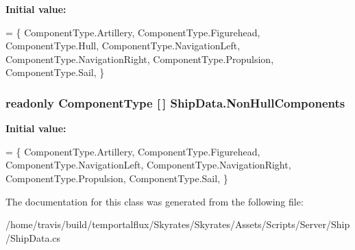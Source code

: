 {\bfseries Initial value\-:}
\begin{DoxyCode}
=
    \{
        ComponentType.Artillery,
        ComponentType.Figurehead,
        ComponentType.Hull,
        ComponentType.NavigationLeft,
        ComponentType.NavigationRight,
        ComponentType.Propulsion,
        ComponentType.Sail,
    \}
\end{DoxyCode}
\hypertarget{class_ship_data_a5ef95366640e8dc06cb884368a8e41a2}{
\subsubsection[{Non\-Hull\-Components}]{\setlength{\rightskip}{0pt plus 5cm}readonly Component\-Type \mbox{[}$\,$\mbox{]} Ship\-Data.\-Non\-Hull\-Components\hspace{0.3cm}{\ttfamily [static]}}}\label{class_ship_data_a5ef95366640e8dc06cb884368a8e41a2}
{\bfseries Initial value\-:}
\begin{DoxyCode}
= \{
        ComponentType.Artillery,
        ComponentType.Figurehead,
        ComponentType.NavigationLeft,
        ComponentType.NavigationRight,
        ComponentType.Propulsion,
        ComponentType.Sail,
    \}
\end{DoxyCode}


The documentation for this class was generated from the following file\-:\begin{DoxyCompactItemize}
\item 
/home/travis/build/temportalflux/\-Skyrates/\-Skyrates/\-Assets/\-Scripts/\-Server/\-Ship/Ship\-Data.\-cs\end{DoxyCompactItemize}
